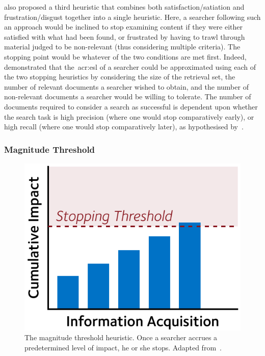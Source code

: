 \cite{kraft1979stopping_rules} also proposed a third heuristic that combines both satisfaction/satiation and frustration/disgust together into a single heuristic. Here, a searcher following such an approach would be inclined to stop examining content if they were either satisfied with what had been found, or frustrated by having to trawl through material judged to be non-relevant (thus considering multiple criteria). The stopping point would be whatever of the two conditions are met first. Indeed,~\cite{kraft1979stopping_rules} demonstrated that the~\gls{acr:esl} of a searcher could be approximated using each of the two stopping heuristics by considering the size of the retrieval set, the number of relevant documents a searcher wished to obtain, and the number of non-relevant documents a searcher would be willing to tolerate. The number of documents required to consider a search as successful is dependent upon whether the search task is high precision (where one would stop comparatively early), or high recall (where one would stop comparatively later), as hypothesised by~\cite{bates1984thirty_items}.

\subsubsection{Magnitude Threshold}\label{sec:stopping_background:heuristics:magnitude}
\begin{figure}
    \begin{center}
    \vspace*{-10mm}
    \includegraphics[width=1\textwidth]{figures/ch3-threshold.pdf}
    \end{center}
    \vspace*{-6mm}
    \caption[The magnitude threshold stopping heuristic]{The magnitude threshold heuristic. Once a searcher accrues a predetermined level of impact, he or she stops. Adapted from~\cite{browne2004stopping_rules}.}
    \label{fig:threshold}
\end{figure}

